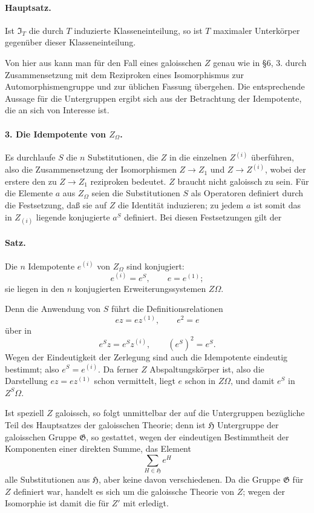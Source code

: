 \documentclass[11pt]{article}
\providecommand{\Gcal}{\mathfrak G}
\begin{document}
\paragraph{Hauptsatz.}
Ist \(\mathfrak I_T\) die durch \(T\) induzierte Klasseneinteilung, so ist \(T\) maximaler Unterkörper gegenüber dieser Klasseneinteilung.

Von hier aus kann man für den Fall eines galoisschen \(Z\) genau wie in §6, 3. durch Zusammensetzung mit dem Reziproken eines Isomorphismus zur Automorphismengruppe und zur üblichen Fassung übergehen. Die entsprechende Aussage für die Untergruppen ergibt sich aus der Betrachtung der Idempotente, die an sich von Interesse ist.

\paragraph{3. Die Idempotente von \(Z_\Omega\).}
Es durchlaufe \(S\) die \(n\) Substitutionen, die \(Z\) in die einzelnen \(Z^{(i)}\) überführen, also die Zusammensetzung der Isomorphismen \(Z\to Z_1\) und \(Z\to Z^{(i)}\), wobei der erstere den zu \(Z\to Z_1\) reziproken bedeutet. \(Z\) braucht nicht galoissch zu sein. Für die Elemente \(a\) aus \(Z_\Omega\) seien die Substitutionen \(S\) als Operatoren definiert durch die Festsetzung, daß sie auf \(Z\) die Identität induzieren; zu jedem \(a\) ist somit das in \(Z_{(i)}\) liegende konjugierte \(a^S\) definiert. Bei diesen Festsetzungen gilt der

\paragraph{Satz.}
Die \(n\) Idempotente \(e^{(i)}\) von \(Z_\Omega\) sind konjugiert:
\[
        e^{(i)}=e^S,\qquad e=e^{(1)};
\]
sie liegen in den \(n\) konjugierten Erweiterungssystemen \(Z\Omega\).

Denn die Anwendung von \(S\) führt die Definitionsrelationen
\[
        ez=ez^{(1)},\qquad e^2=e
\]
über in
\[
        e^S z=e^S z^{(i)},\qquad (e^S)^2=e^S .
\]
Wegen der Eindeutigkeit der Zerlegung sind auch die Idempotente eindeutig bestimmt; also \(e^S=e^{(i)}\). Da ferner \(Z\) Abspaltungskörper ist, also die Darstellung \(ez=ez^{(1)}\) schon vermittelt, liegt \(e\) schon in \(Z\Omega\), und damit \(e^S\) in \(Z^S\Omega\).

Ist speziell \(Z\) galoissch, so folgt unmittelbar der auf die Untergruppen bezügliche Teil des Hauptsatzes der galoisschen Theorie; denn ist \(\mathfrak H\) Untergruppe der galoisschen Gruppe \(\Gcal\), so gestattet, wegen der eindeutigen Bestimmtheit der Komponenten einer direkten Summe, das Element
\[
        \sum_{H\in\mathfrak H} e^H
\]
alle Substitutionen aus \(\mathfrak H\), aber keine davon verschiedenen. Da die Gruppe \(\Gcal\) für \(Z\) definiert war, handelt es sich um die galoissche Theorie von \(Z\); wegen der Isomorphie ist damit die für \(Z'\) mit erledigt.
\end{document}
